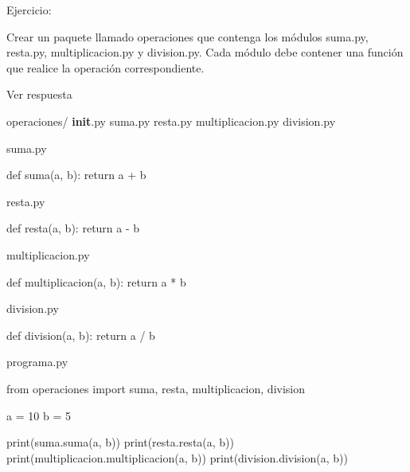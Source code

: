 \documentclass[
  a4paper,
  DIV=11,
  numbers=noendperiod,
  onepage,
  openany]{scrreprt}
\newenvironment{Shaded}{\begin{snugshade}}{\end{snugshade}}
\newcommand{\BuiltInTok}[1]{\textcolor[rgb]{0.00,0.23,0.31}{#1}}
\newcommand{\ControlFlowTok}[1]{\textcolor[rgb]{0.00,0.23,0.31}{#1}}
\newcommand{\DecValTok}[1]{\textcolor[rgb]{0.68,0.00,0.00}{#1}}
\newcommand{\ImportTok}[1]{\textcolor[rgb]{0.00,0.46,0.62}{#1}}
\newcommand{\KeywordTok}[1]{\textcolor[rgb]{0.00,0.23,0.31}{#1}}
\newcommand{\NormalTok}[1]{\textcolor[rgb]{0.00,0.23,0.31}{#1}}
\newcommand{\OperatorTok}[1]{\textcolor[rgb]{0.37,0.37,0.37}{#1}}
\begin{document}
Ejercicio:

Crear un paquete llamado operaciones que contenga los módulos suma.py,
resta.py, multiplicacion.py y division.py. Cada módulo debe contener una
función que realice la operación correspondiente.

Ver respuesta

operaciones/ \textbf{init}.py suma.py resta.py multiplicacion.py
division.py

suma.py

\begin{Shaded}
\begin{Highlighting}[]
\KeywordTok{def}\NormalTok{ suma(a, b):}
    \ControlFlowTok{return}\NormalTok{ a }\OperatorTok{+}\NormalTok{ b}
\end{Highlighting}
\end{Shaded}

resta.py

\begin{Shaded}
\begin{Highlighting}[]
\KeywordTok{def}\NormalTok{ resta(a, b):}
    \ControlFlowTok{return}\NormalTok{ a }\OperatorTok{{-}}\NormalTok{ b}
\end{Highlighting}
\end{Shaded}

multiplicacion.py

\begin{Shaded}
\begin{Highlighting}[]
\KeywordTok{def}\NormalTok{ multiplicacion(a, b):}
    \ControlFlowTok{return}\NormalTok{ a }\OperatorTok{*}\NormalTok{ b}
\end{Highlighting}
\end{Shaded}

division.py

\begin{Shaded}
\begin{Highlighting}[]
\KeywordTok{def}\NormalTok{ division(a, b):}
    \ControlFlowTok{return}\NormalTok{ a }\OperatorTok{/}\NormalTok{ b}
\end{Highlighting}
\end{Shaded}

programa.py

\begin{Shaded}
\begin{Highlighting}[]
\ImportTok{from}\NormalTok{ operaciones }\ImportTok{import}\NormalTok{ suma, resta, multiplicacion, division}

\NormalTok{a }\OperatorTok{=} \DecValTok{10}
\NormalTok{b }\OperatorTok{=} \DecValTok{5}

\BuiltInTok{print}\NormalTok{(suma.suma(a, b))}
\BuiltInTok{print}\NormalTok{(resta.resta(a, b))}
\BuiltInTok{print}\NormalTok{(multiplicacion.multiplicacion(a, b))}
\BuiltInTok{print}\NormalTok{(division.division(a, b))}
\end{Highlighting}
\end{Shaded}
\end{document}
